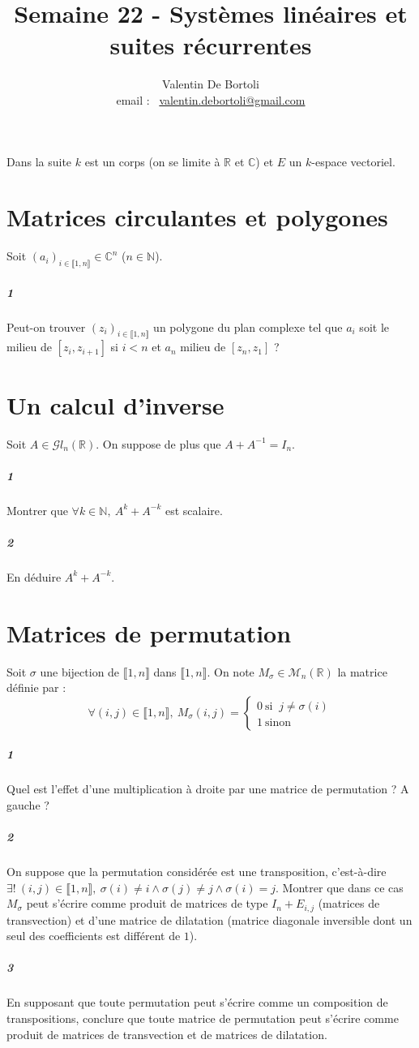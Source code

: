\documentclass[10pt,a4paper]{article}
\title{Semaine 22 - Systèmes linéaires et suites récurrentes}
\author{Valentin De Bortoli \\ email : \ \href{mailto:valentin.debortoli@gmail.com}{valentin.debortoli@gmail.com}}
\date{}
\begin{document}
\maketitle
Dans la suite $k$ est un corps (on se limite à $\mathbb{R}$ et $\mathbb{C}$) et $E$ un $k$-espace vectoriel.

\section{Matrices circulantes et polygones}
Soit $(a_i)_{i \in \llbracket 1,n\rrbracket} \in \mathbb{C}^n$ ($n \in \mathbb{N}$).
\subparagraph{1}Peut-on trouver $(z_i)_{i \in \llbracket 1,n \rrbracket}$ un polygone du plan complexe tel que $a_i$ soit le milieu de $[z_i,z_{i+1}]$ si $i<n$ et $a_n$ milieu de $[z_n,z_1]$ ?


\section{Un calcul d'inverse}
Soit $A \in \mathcal{G}l_n\left( \mathbb{R} \right)$. On suppose de plus que $A+A^{-1}=I_n$.
\subparagraph{1}Montrer que $\forall k \in \mathbb{N}, \ A^k+A^{-k}$ est scalaire.
\subparagraph{2}En déduire $A^k+A^{-k}$.


\section{Matrices de permutation}
Soit $\sigma$ une bijection de $\llbracket 1,n \rrbracket$ dans $\llbracket 1,n \rrbracket$. On note $M_{\sigma} \in \mathcal{M}_n\left( \mathbb{R} \right)$ la matrice définie par :
\begin{equation*}
\forall (i,j) \in \llbracket 1,n \rrbracket, \ M_{\sigma}(i,j) = \left\lbrace \begin{matrix} 0 \ \text{si } \ j \neq \sigma(i) \\ 
1 \ \text{sinon}\end{matrix} \right.
\end{equation*}
\subparagraph{1}Quel est l'effet d'une multiplication à droite par une matrice de permutation ? A gauche ?
\subparagraph{2}On suppose que la permutation considérée est une transposition, c'est-à-dire $\exists! \ (i,j) \in \llbracket 1,n \rrbracket, \ \sigma(i) \neq i \wedge \sigma(j) \neq j \wedge \sigma(i)=j$. Montrer que dans ce cas $M_{\sigma}$ peut s'écrire comme produit de matrices de type $I_n+E_{i,j}$ (matrices de transvection) et d'une matrice de dilatation (matrice diagonale inversible dont un seul des coefficients est différent de $1$).
\subparagraph{3}En supposant que toute permutation peut s'écrire comme un composition de transpositions, conclure que toute matrice de permutation peut s'écrire comme produit de matrices de transvection et de matrices de dilatation.
\end{document}
